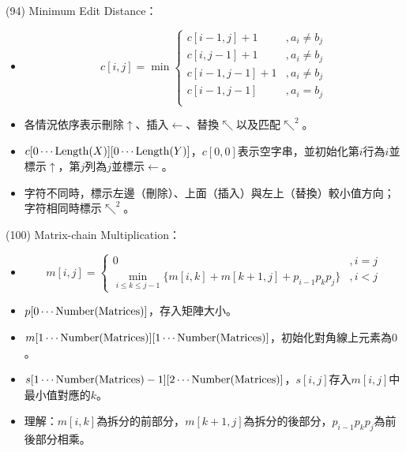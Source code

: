 \item \begin{theorem}{(94)} Minimum Edit Distance：\begin{itemize}
        \item \begin{equation}
            c[i, j] = \min\begin{cases}
                c[i - 1, j] + 1 &, a_i \neq b_j \\
                c[i, j - 1] + 1 &, a_i \neq b_j \\
                c[i - 1, j - 1] + 1 &, a_i \neq b_j \\
                c[i - 1, j - 1] &, a_i = b_j \\
            \end{cases}
        \end{equation}
        \item 各情況依序表示刪除$\uparrow$、插入$\leftarrow$、替換$\nwarrow$以及匹配$\nwarrow^2$。
        \item $c[0 \cdots \operatorname{Length}(X)][0 \cdots \operatorname{Length}(Y)]$，$c[0, 0]$表示空字串，並初始化第$i$行為$i$並標示$\uparrow$，第$j$列為$j$並標示$\leftarrow$。
        \item 字符不同時，標示左邊（刪除）、上面（插入）與左上（替換）較小值方向；字符相同時標示$\nwarrow^2$。
    \end{itemize}
\end{theorem}

\item \begin{theorem}{(100)} Matrix-chain Multiplication：\begin{itemize}
        \item \begin{equation}
            m[i, j] = \begin{cases}
                0 &, i = j \\
                \min_{i \le k \le j - 1}\{m[i, k] + m[k + 1, j] + p_{i - 1}p_kp_j\} &, i < j
            \end{cases}
        \end{equation} 
        \item $p[0 \cdots \operatorname{Number}(\text{Matrices})]$，存入矩陣大小。
        \item $m[1 \cdots \operatorname{Number}(\text{Matrices})][1 \cdots \operatorname{Number}(\text{Matrices})]$，初始化對角線上元素為$0$。
        \item $s[1 \cdots \operatorname{Number}(\text{Matrices}) - 1][2 \cdots \operatorname{Number}(\text{Matrices})]$，$s[i, j]$存入$m[i, j]$中最小值對應的$k$。
        \item 理解：$m[i, k]$為拆分的前部分，$m[k + 1, j]$為拆分的後部分，$p_{i - 1}p_kp_j$為前後部分相乘。
    \end{itemize}
\end{theorem}

